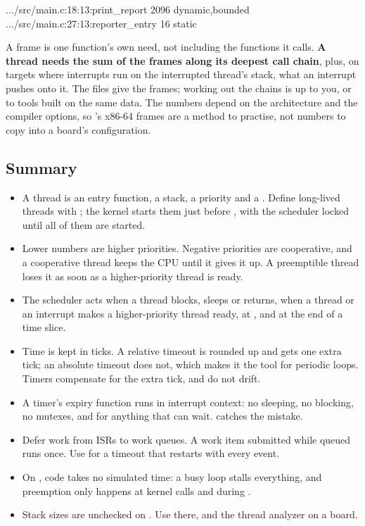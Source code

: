 \begin{console}
.../src/main.c:18:13:print_report	2096	dynamic,bounded
.../src/main.c:27:13:reporter_entry	16	static
\end{console}

\noindent A frame is one function’s own need, not including the functions it calls. \textbf{A thread
needs the sum of the frames along its deepest call chain}, plus, on targets where interrupts run on
the interrupted thread’s stack, what an interrupt pushes onto it. The  files give the
frames; working out the chains is up to you, or to tools built on the same data. The numbers depend
on the architecture and the compiler options, so ’s x86-64 frames are a method to
practise, not numbers to copy into a board’s configuration.

\subsection{Summary}
\begin{itemize}
  \item A thread is an entry function, a stack, a priority and a . Define long-lived
    threads with ; the kernel starts them just before , with the
    scheduler locked until all of them are started.
  \item Lower numbers are higher priorities. Negative priorities are cooperative, and a cooperative thread
    keeps the CPU until it gives it up. A preemptible thread loses it as soon as a higher-priority
    thread is ready.
  \item The scheduler acts when a thread blocks, sleeps or returns, when a thread or an interrupt makes a
    higher-priority thread ready, at , and at the end of a time slice.
  \item Time is kept in ticks. A relative timeout is rounded up and gets one extra tick; an absolute timeout
    does not, which makes it the tool for periodic loops. Timers compensate for the extra tick, and do
    not drift.
  \item A timer’s expiry function runs in interrupt context: no sleeping, no blocking, no mutexes, and
     for anything that can wait.  catches the mistake.
  \item Defer work from ISRs to work queues. A work item submitted while queued runs once. Use
     for a timeout that restarts with every event.
  \item On , code takes no simulated time: a busy loop stalls everything, and preemption
    only happens at kernel calls and during .
  \item Stack sizes are unchecked on . Use  there, and the thread
    analyzer on a board.
\end{itemize}
